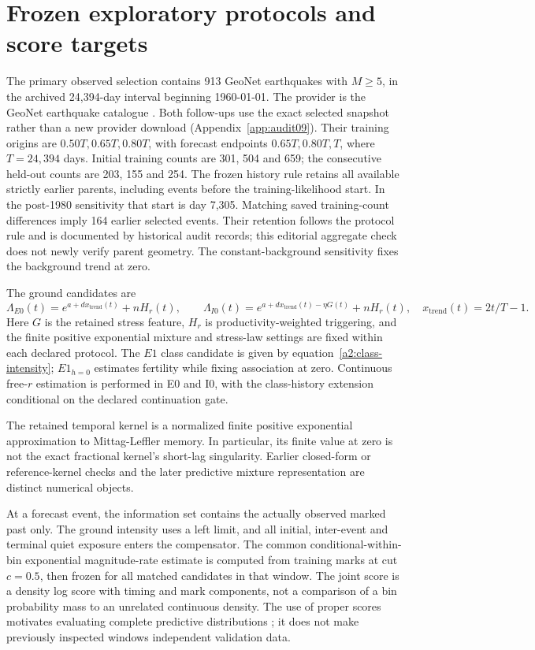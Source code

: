 \section{Frozen exploratory protocols and score targets}
\label{a2:protocol}

The primary observed selection contains 913 GeoNet earthquakes with
\(M\geq5\), in the archived 24,394-day interval beginning 1960-01-01.
The provider is the GeoNet earthquake catalogue \citep{GeoNetCatalogue}.
Both follow-ups use the exact selected snapshot rather than a new provider
download (Appendix~\ref{app:audit09}).
Their training origins are \(0.50T,0.65T,0.80T\), with forecast endpoints
\(0.65T,0.80T,T\), where \(T=24{,}394\) days. Initial training counts are
301, 504 and 659; the consecutive held-out counts are 203, 155 and 254.
The frozen history rule retains all available strictly earlier parents,
including events before the training-likelihood start. In the post-1980
sensitivity that start is day 7,305. Matching saved training-count
differences imply 164 earlier selected events. Their retention follows
the protocol rule and is documented by historical audit records; this
editorial aggregate check does not newly verify parent geometry. The
constant-background sensitivity fixes the background trend at zero.

The ground candidates are
\[
 \Lambda_{E0}(t)=e^{a+d x_{\mathrm{trend}}(t)}+nH_r(t),\qquad
 \Lambda_{I0}(t)=e^{a+d x_{\mathrm{trend}}(t)-\eta G(t)}+nH_r(t),
 \quad x_{\mathrm{trend}}(t)=2t/T-1.
\]
Here \(G\) is the retained stress feature, \(H_r\) is productivity-weighted
triggering, and the finite positive exponential mixture and stress-law
settings are fixed within each declared protocol. The \(E1\) class
candidate is given by equation~\eqref{a2:class-intensity};
\(E1_{h=0}\) estimates fertility while fixing association at zero.
Continuous free-\(r\) estimation is performed in E0 and I0, with the
class-history extension conditional on the declared continuation gate.

The retained temporal kernel is a normalized finite positive exponential
approximation to Mittag-Leffler memory. In particular, its finite value
at zero is not the exact fractional kernel's short-lag singularity.
Earlier closed-form or reference-kernel checks and the later predictive
mixture representation are distinct numerical objects.

At a forecast event, the information set contains the actually observed
marked past only. The ground intensity uses a left limit, and all
initial, inter-event and terminal quiet exposure enters the compensator.
The common conditional-within-bin exponential magnitude-rate estimate is
computed from training marks at cut \(c=0.5\), then frozen for all matched
candidates in that window. The joint score is a density log score with
timing and mark components, not a comparison of a bin probability mass to
an unrelated continuous density. The use of proper scores motivates
evaluating complete predictive distributions \citep{GneitingRaftery2007};
it does not make previously inspected windows independent validation data.

